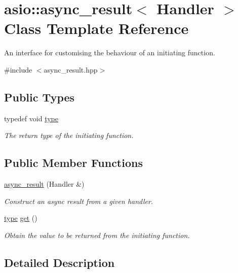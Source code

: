 \hypertarget{classasio_1_1async__result}{}\section{asio\+:\+:async\+\_\+result$<$ Handler $>$ Class Template Reference}
\label{classasio_1_1async__result}


An interface for customising the behaviour of an initiating function.  




{\ttfamily \#include $<$async\+\_\+result.\+hpp$>$}

\subsection*{Public Types}
\begin{DoxyCompactItemize}
\item 
typedef void \hyperlink{classasio_1_1async__result_ac7d274968af729b26f7cb3de62bf4eb7}{type}
\begin{DoxyCompactList}\small\item\em The return type of the initiating function. \end{DoxyCompactList}\end{DoxyCompactItemize}
\subsection*{Public Member Functions}
\begin{DoxyCompactItemize}
\item 
\hyperlink{classasio_1_1async__result_a082cebe0e7344a7088415ed587abdc4e}{async\+\_\+result} (Handler \&)
\begin{DoxyCompactList}\small\item\em Construct an async result from a given handler. \end{DoxyCompactList}\item 
\hyperlink{classasio_1_1async__result_ac7d274968af729b26f7cb3de62bf4eb7}{type} \hyperlink{classasio_1_1async__result_a5f1b8e864e413d3c34888883a63eab73}{get} ()
\begin{DoxyCompactList}\small\item\em Obtain the value to be returned from the initiating function. \end{DoxyCompactList}\end{DoxyCompactItemize}


\subsection{Detailed Description}

